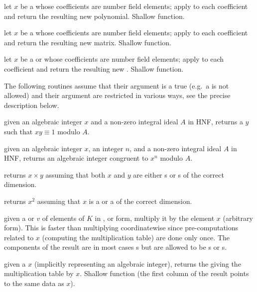  let $x$ be a  whose coefficients
are number field elements; apply  to each
coefficient and return the resulting new polynomial. Shallow function.

 let $x$ be a  whose coefficients
are number field elements; apply  to each
coefficient and return the resulting new matrix. Shallow function.

 let $x$ be a  or
 whose coefficients
are number field elements; apply  to each
coefficient and return the resulting new . Shallow function.

 The following routines assume that their 
argument is a true  (e.g.~a  is not allowed) and their
argument are restricted in various ways, see the precise description below.

 given an algebraic integer
$x$ and a non-zero integral ideal $A$ in HNF, returns a $y$ such that
$xy \equiv 1$ modulo $A$.

 given an algebraic
integer $x$, an integer $n$, and a non-zero integral ideal $A$ in HNF,
returns an algebraic integer congruent to $x^n$ modulo $A$.

 returns $x\times y$ assuming
that both $x$ and $y$ are either s or s of the correct
dimension.

 returns $x^2$ assuming that $x$ is a 
or a  of the correct dimension.

 given a  or 
$v$ of elements of $K$ in ,  or  form, multiply
it by the element $x$ (arbitrary form). This is faster than multiplying
coordinatewise since pre-computations related to $x$ (computing the
multiplication table) are done only once. The components of the result
are in most cases s but are allowed to be s or s.

 given a  $x$ (implicitly
representing an algebraic integer), returns the  giving the
multiplication table by $x$. Shallow function (the first column of the result
points to the same data as $x$).

